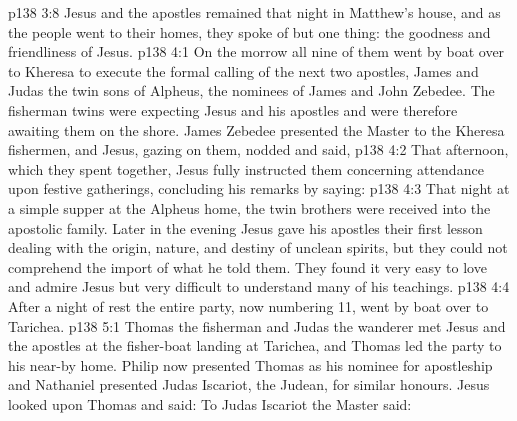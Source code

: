 \vs p138 3:8 Jesus and the apostles remained that night in Matthew’s house, and as the people went to their homes, they spoke of but one thing: the goodness and friendliness of Jesus.
\vs p138 4:1 On the morrow all nine of them went by boat over to Kheresa to execute the formal calling of the next two apostles, James and Judas the twin sons of Alpheus, the nominees of James and John Zebedee. The fisherman twins were expecting Jesus and his apostles and were therefore awaiting them on the shore. James Zebedee presented the Master to the Kheresa fishermen, and Jesus, gazing on them, nodded and said, 
\vs p138 4:2 \pc That afternoon, which they spent together, Jesus fully instructed them concerning attendance upon festive gatherings, concluding his remarks by saying: 
\vs p138 4:3 \pc That night at a simple supper at the Alpheus home, the twin brothers were received into the apostolic family. Later in the evening Jesus gave his apostles their first lesson dealing with the origin, nature, and destiny of unclean spirits, but they could not comprehend the import of what he told them. They found it very easy to love and admire Jesus but very difficult to understand many of his teachings.
\vs p138 4:4 After a night of rest the entire party, now numbering 11, went by boat over to Tarichea.
\vs p138 5:1 Thomas the fisherman and Judas the wanderer met Jesus and the apostles at the fisher\hyp{}boat landing at Tarichea, and Thomas led the party to his near-by home. Philip now presented Thomas as his nominee for apostleship and Nathaniel presented Judas Iscariot, the Judean, for similar honours. Jesus looked upon Thomas and said:  To Judas Iscariot the Master said: 
